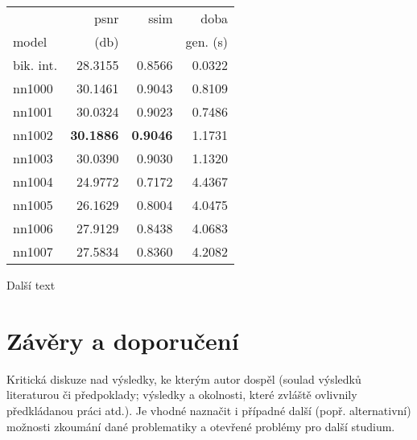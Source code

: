			\begin{table}[hbt!]
				\centering
				\begin{tabular}{| l | r | r | r | }
					\hline
					&        psnr &      ssim &      doba  \\
					model &       (db)    &           & gen. (s) \\
					\hline
					bik. int. & 28.3155 & 0.8566 & 0.0322 \\
					nn1000    & 30.1461 & 0.9043 & 0.8109 \\
					nn1001    & 30.0324 & 0.9023 & 0.7486 \\
					nn1002    & \textbf{30.1886} & \textbf{0.9046} & 1.1731 \\
					nn1003    & 30.0390 & 0.9030 & 1.1320 \\
					nn1004    & 24.9772 & 0.7172 & 4.4367 \\
					nn1005    & 26.1629 & 0.8004 & 4.0475 \\
					nn1006    & 27.9129 & 0.8438 & 4.0683 \\
					nn1007    & 27.5834 & 0.8360 & 4.2082 \\
					\hline
				\end{tabular}
			\end{table}

			\newpage

			Další text

\section{Závěry a doporučení}


Kritická diskuze nad výsledky, ke kterým autor dospěl (soulad výsledků  literaturou či předpoklady;
výsledky a okolnosti, které zvláště ovlivnily předkládanou práci atd.). Je vhodné naznačit i případné další
(popř. alternativní) možnosti zkoumání dané problematiky a otevřené problémy pro další studium.
